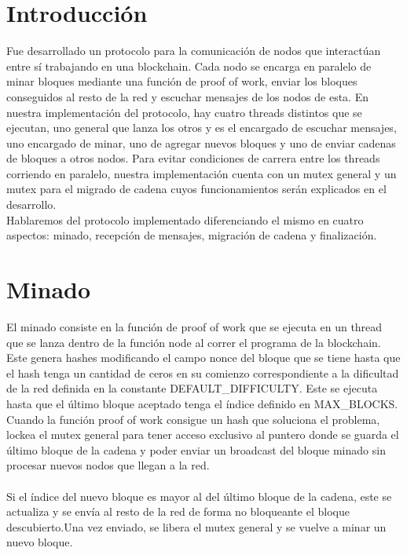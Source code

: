 \section{Introducción}

Fue desarrollado un protocolo para la comunicación de nodos que interactúan entre sí trabajando en una blockchain. Cada nodo se encarga en paralelo de minar bloques mediante una función de proof of work, enviar los bloques conseguidos al resto de la red y escuchar mensajes de los nodos de esta. En nuestra implementación del protocolo, hay cuatro threads distintos que se ejecutan, uno general que lanza los otros y es el encargado de escuchar mensajes, uno encargado de minar, uno de agregar nuevos bloques y uno de enviar cadenas de bloques a otros nodos. Para evitar condiciones de carrera entre los threads corriendo en paralelo, nuestra implementación cuenta con un mutex general y un mutex para el migrado de cadena cuyos funcionamientos serán explicados en el desarrollo.
\\
Hablaremos del protocolo implementado diferenciando el mismo en cuatro aspectos: minado, recepción de mensajes, migración de cadena y finalización.

\section{Minado}


El minado consiste en la función de proof of work que se ejecuta en un thread que se lanza dentro de la función node al correr el programa de la blockchain. Este genera hashes modificando el campo nonce del bloque que se tiene hasta que el hash tenga un cantidad de ceros en su comienzo correspondiente a la dificultad de la red definida en la constante DEFAULT_DIFFICULTY. Este se ejecuta hasta que el último bloque aceptado tenga el índice definido en MAX_BLOCKS.\\

Cuando la función proof of work consigue un hash que soluciona el problema, lockea el mutex general para tener acceso exclusivo al puntero donde se guarda el último bloque de la cadena y poder enviar un broadcast del bloque minado sin procesar nuevos nodos que llegan a la red.\\
\\
Si el índice del nuevo bloque es mayor al del último bloque de la cadena, este se actualiza y se envía al resto de la red de forma no bloqueante el bloque descubierto.Una vez enviado, se libera el mutex general y se vuelve a minar un nuevo bloque.
\\


